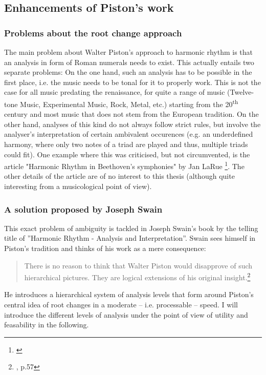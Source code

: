 \documentclass[a4paper,12pt]{report}
\begin{document}
\subsection{Enhancements of Piston's work}
\subsubsection{Problems about the root change approach}
The main problem about Walter Piston's approach to harmonic rhythm is that an analysis in form of Roman numerals needs to exist. This actually entails two separate problems: On the one hand, such an analysis has to be possible in the first place, i.e. the music needs to be tonal for it to properly work. This is not the case for all music predating the renaissance, for quite a range of music (Twelve-tone Music, Experimental Music, Rock, Metal, etc.) starting from the 20\textsuperscript{th} century and most music that does not stem from the European tradition. On the other hand, analyses of this kind do not always follow strict rules, but involve the analyser's interpretation of certain ambivalent occurences (e.g. an underdefined harmony, where only two notes of a triad are played and thus, multiple triads could fit). One example where this was criticised, but not circumvented, is the article "Harmonic Rhythm in Beethoven's symphonies" by Jan LaRue \footnote{\cite{la2001harmonic}}. The other details of the article are of no interest to this thesis (although quite interesting from a musicological point of view).

\subsubsection{A solution proposed by Joseph Swain}
This exact problem of ambiguity is tackled in Joseph Swain's book by the telling title of ''Harmonic Rhythm - Analysis and Interpretation''. Swain sees himself in Piston's tradition and thinks of his work as a mere consequence: \begin{quote}There is no reason to think that Walter Piston would disapprove of such hierarchical pictures. They are logical extensions of his original insight.\footnote{\cite{swain2002harmonic}, p.57}\end{quote} He introduces a hierarchical system of analysis levels that form around Piston's central idea of root changes in a moderate -- i.e. processable -- speed. I will introduce the different levels of analysis under the point of view of utility and feasability in the following.
\end{document}

